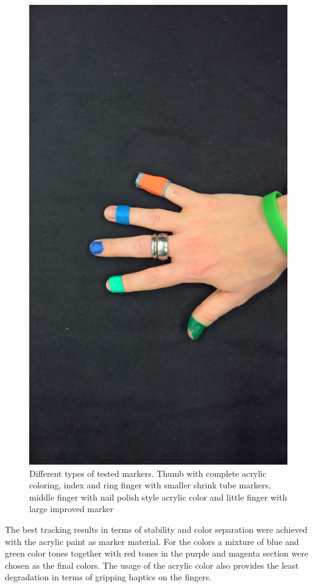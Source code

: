 \begin{figure}[H]
\centering
\includegraphics[width=\textwidth/2]{images/different_markers.jpg}
\caption{Different types of tested markers. Thumb with complete acrylic coloring, index and ring finger with smaller shrink tube markers, middle finger with nail polish style acrylic color and little finger with large improved marker}
\label{img:differnt_markers}
\end{figure}
The best tracking results in terms of stability and color separation were achieved with the acrylic paint as marker material. For the colors a mixture of blue and green color tones together with red tones in the purple and magenta section were chosen as the final colors.
 The usage of the acrylic color also provides the least degradation in terms of gripping haptics on the fingers.
